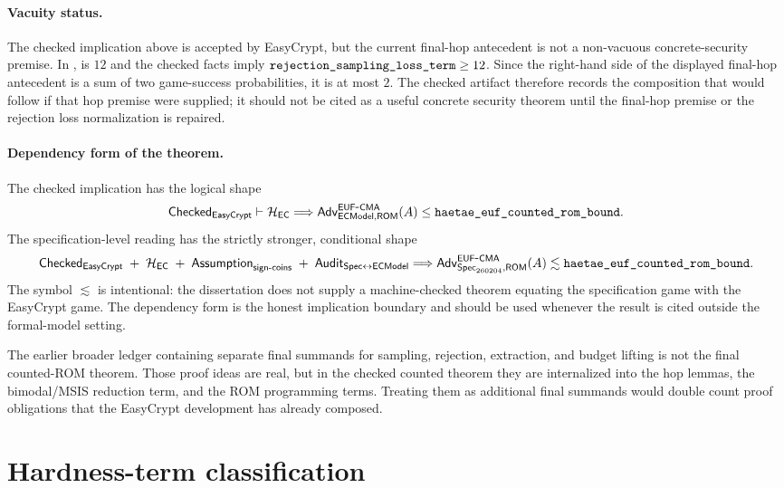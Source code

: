 \paragraph{Vacuity status.}
The checked implication above is accepted by EasyCrypt, but the current
final-hop antecedent
is not a non-vacuous concrete-security premise.  In
,  is \(12\)
and the checked facts imply
\(\texttt{rejection\_sampling\_loss\_term}\ge 12\).  Since the right-hand side of
the displayed final-hop antecedent is a sum of two game-success probabilities,
it is at most \(2\).  The checked artifact therefore records the composition
that would follow if that hop premise were supplied; it should not be cited as a
useful concrete security theorem until the final-hop premise or the rejection
loss normalization is repaired.

\paragraph{Dependency form of the theorem.}
The checked implication has the logical shape
\[
  \mathsf{Checked}_{\textsf{EasyCrypt}}
  \vdash
  \mathcal{H}_{\mathsf{EC}}
  \Longrightarrow
  \mathsf{Adv}_{\mathsf{ECModel},\mathsf{ROM}}^{\mathsf{EUF}\mbox{-}\mathsf{CMA}}(A)
  \le \texttt{haetae\_euf\_counted\_rom\_bound}.
\]
The specification-level reading has the strictly stronger, conditional shape
\[
  \mathsf{Checked}_{\textsf{EasyCrypt}}
  \;+\;
  \mathcal{H}_{\mathsf{EC}}
  \;+\;
  \mathsf{Assumption}_{\mathsf{sign\text{-}coins}}
  \;+\;
  \mathsf{Audit}_{\mathsf{Spec}\leftrightarrow\mathsf{ECModel}}
  \Longrightarrow
  \mathsf{Adv}_{\mathsf{Spec}_{260204},\mathsf{ROM}}^{\mathsf{EUF}\mbox{-}\mathsf{CMA}}(A)
  \lesssim
  \texttt{haetae\_euf\_counted\_rom\_bound}.
\]
The symbol \(\lesssim\) is intentional: the dissertation does not supply a
machine-checked theorem equating the specification game with the EasyCrypt game.
The dependency form is the honest implication boundary and should be used whenever
the result is cited outside the formal-model setting.

The earlier broader ledger containing separate final summands for sampling,
rejection, extraction, and budget lifting is not the final counted-ROM theorem.
Those proof ideas are real, but in the checked counted theorem they are
internalized into the hop lemmas, the bimodal/MSIS reduction term, and the ROM
programming terms.  Treating them as additional final summands would double
count proof obligations that the EasyCrypt development has already composed.

\section{Hardness-term classification}
\label{sec:synthesis-hardness-classification}

